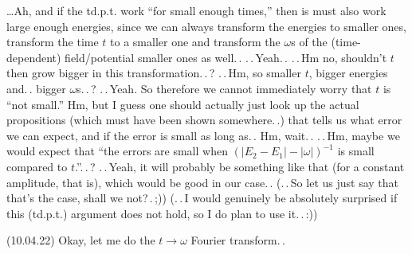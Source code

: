 \documentclass{report}
\begin{document}
\ldots Ah, and if the td.p.t. work ``for small enough times,'' then is must also work large enough energies, since we can always transform the energies to smaller ones, transform the time $t$ to a smaller one and transform the $\omega$s of the (time-dependent) field/potential smaller ones as well.\,. .\,.\,Yeah.\,. .\,.\,Hm no, shouldn't $t$ then grow bigger in this transformation.\,.\,? .\,.\,Hm, so smaller $t$, bigger energies and.\,. bigger $\omega$s.\,.\,? .\,.\,Yeah. So therefore we cannot immediately worry that $t$ is ``not small.'' Hm, but I guess one should actually just look up the actual propositions (which must have been shown somewhere.\,.) that tells us what error we can expect, and if the error is small as long as.\,. Hm, wait.\,. .\,.\,Hm, maybe we would expect that ``the errors are small when $(|E_2 - E_1|-|\omega|)^{-1}$ is small compared to $t$.''.\,.\,? .\,.\,Yeah, it will probably be something like that (for a constant amplitude, that is), which would be good in our case.\,. %
(.\,.\,So let us just say that that's the case, shall we not?\,.\,;)) (.\,.\,I would genuinely be absolutely surprised if this (td.p.t.) argument does not hold, so I do plan to use it.\,.\,:))

(10.04.22) Okay, let me do the $t\to\omega$ Fourier transform.\,. 
\end{document}
